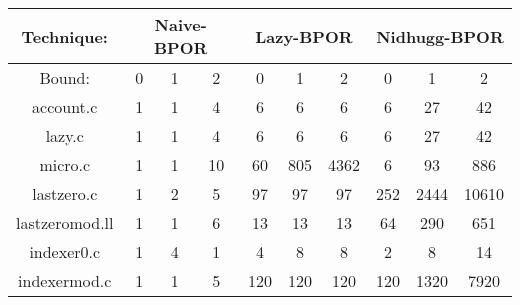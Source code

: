 \begin{center}
\begin{tabular}{ |c|c|c|c|c|c|c|c|c|c|}
\hline
\multicolumn{1}{|c|}{Technique:} & \multicolumn{3}{c|}{Naive-BPOR} & \multicolumn{3}{c|}{Lazy-BPOR} & \multicolumn{3}{c|}{Nidhugg-BPOR} \\
\hline
Bound: & 0 & 1 & 2 & 0 & 1 & 2 & 0 & 1 & 2 \\
\hline \hline
account.c & 1 & 1 & 4 & 6 & 6 & 6 & 6 & 27 & 42 \\
\hline
lazy.c & 1 & 1 & 4 & 6 & 6 & 6 & 6 & 27 & 42 \\
\hline
micro.c & 1 & 1 & 10 & 60 & 805 & 4362 & 6 & 93 & 886 \\
\hline
lastzero.c & 1 & 2 & 5 & 97 & 97 & 97 & 252 & 2444 & 10610 \\
\hline
lastzeromod.ll & 1 & 1 & 6 & 13 & 13 & 13 & 64 & 290 & 651 \\
\hline
indexer0.c & 1 & 4 & 1 & 4 & 8 & 8 & 2 & 8 & 14 \\
\hline
indexermod.c & 1 & 1 & 5 & 120 & 120 & 120 & 120 & 1320 & 7920 \\
\hline
\end{tabular}
\end{center}
